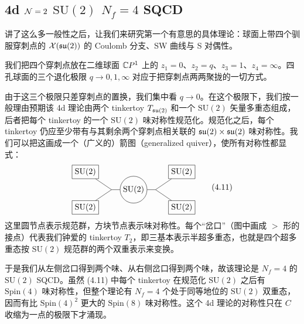 \subsection{4d $\mathcal{N}=2$ $\mathrm{SU}(2)$ $N_f=4$ SQCD}

讲了这么多一般性之后，让我们来研究第一个有意思的具体理论：球面上带四个驯服穿刺点的 $\mathcal{X}(\mathfrak{su}(2))$ 的 Coulomb 分支、SW 曲线与 S 对偶性。

 我们把四个穿刺点放在二维球面 $\mathbb{C} P^1$ 上的 $z_1=0$、$z_2=q$、$z_3=1$、$z_4=\infty$。四孔球面的三个退化极限 $q\to0,1,\infty$ 对应于把穿刺点两两聚拢的一切方式。

由于这三个极限只差穿刺点的置换，我们集中看 $q\to0$。在这个极限下，我们按一般理由预期该 4d 理论由两个 tinkertoy $T_{\mathfrak{su}(2)}$ 和一个 $\mathrm{SU}(2)$ 矢量多重态组成，后者把每个 tinkertoy 的一个 $\mathrm{SU}(2)$ 味对称性规范化。规范化之后，每个 tinkertoy 仍应至少带有与其剩余两个穿刺点相关联的 $\mathfrak{su}(2)\times\mathfrak{su}(2)$ 味对称性。我们可以把这画成一个（广义的）箭图（generalized quiver），使所有对称性都显式：
\begin{equation}
\begin{tikzpicture}[scale=0.9,baseline=(current bounding box.center)]
  \node[draw,rectangle] (l1) at (-2.3,0.85) {$\mathrm{SU}(2)$};
  \node[draw,rectangle] (l2) at (-2.3,-0.85) {$\mathrm{SU}(2)$};
  \node[draw,circle,inner sep=2pt] (g) at (0,0) {$\mathrm{SU}(2)$};
  \node[draw,rectangle] (r1) at (2.3,0.85) {$\mathrm{SU}(2)$};
  \node[draw,rectangle] (r2) at (2.3,-0.85) {$\mathrm{SU}(2)$};
  \draw (l1) -- (-1.05,0) -- (l2);
  \draw (-1.05,0) -- (g);
  \draw (r1) -- (1.05,0) -- (r2);
  \draw (1.05,0) -- (g);
\end{tikzpicture}
\tag{4.11}
\end{equation}
这里圆节点表示规范群，方块节点表示味对称性。每个“岔口”（图中画成 $>$ 形的接点）代表我们钟爱的 tinkertoy $T_2$，即三基本表示半超多重态，也就是四个超多重态按 $\mathrm{SU}(2)$ 规范群的两个双重表示来变换。

于是我们从左侧岔口得到两个味、从右侧岔口得到两个味，故该理论是 $N_f=4$ 的 $\mathrm{SU}(2)$ SQCD。虽然 (4.11) 中每个 tinkertoy 在规范化 $\mathrm{SU}(2)$ 之后有 $\mathrm{Spin}(4)$ 味对称性，但整个理论有 $N_f=4$ 个处于同等地位的 $\mathrm{SU}(2)$ 双重态，因而有比 $\mathrm{Spin}(4)^2$ 更大的 $\mathrm{Spin}(8)$ 味对称性。这个 4d 理论的对称性只在 $C$ 收缩为一点的极限下才涌现。


